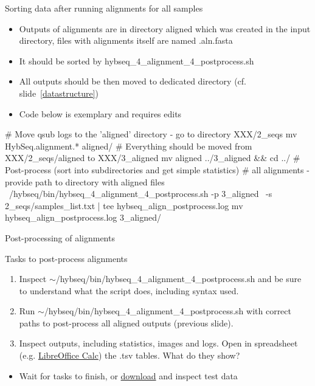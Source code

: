 \documentclass[compress,  xelatex, 11pt, xcolor=x11names, aspectratio=169,
	hyperref={
		bookmarks=true,
		unicode=true,
		colorlinks=true,
		pdftitle={HybSeq course},
		plainpages=false,
		pdfauthor={Vojtech Zeisek},
		pdfsubject={Practical processing of HybSeq target enrichment sequencing data on computing grids like MetaCentrum},
		pdfcreator={XeLaTeX},
		pdfkeywords={BASH, command line, GNU, HybSeq, Linux, MetaCentrum, sequencing shell, target enrichment},
		linkcolor=Turquoise4, %
		anchorcolor=DodgerBlue4, %
		citecolor=DodgerBlue4, %
		filecolor=DodgerBlue4, %
		menucolor=Tan4, %
		urlcolor=DarkOliveGreen4 %
		},
	url={hyphens, lowtilde} %
	]{beamer}
\renewcommand{\texttt}[1]{\colorbox{Cornsilk2}{{\ttfamily #1}}}
\renewcommand{\alert}[1]{\textcolor{OrangeRed3}{#1}}
\begin{document}
\begin{frame}[fragile]{Sorting data after running alignments for all samples}
	\begin{itemize}
		\item Outputs of alignments are in directory \texttt{aligned} which was created in the input directory, files with alignments itself are named \texttt{*.aln.fasta}
		\item It should be sorted by \texttt{hybseq\_4\_alignment\_4\_postprocess.sh}
		\item All outputs should be then moved to dedicated directory (cf. slide~\ref{datastructure})
		\item \alert{Code below is exemplary and requires edits}
	\end{itemize}
	\begin{bashcode}
    # Move qsub logs to the 'aligned' directory - go to directory XXX/2_seqs
    mv HybSeq.alignment.* aligned/
    # Everything should be moved from XXX/2_seqs/aligned to XXX/3_aligned
    mv aligned ../3_aligned && cd ../
    # Post-process (sort into subdirectories and get simple statistics)
    # all alignments - provide path to directory with aligned files
    ~/hybseq/bin/hybseq_4_alignment_4_postprocess.sh -p 3_aligned \
      -s 2_seqs/samples_list.txt | tee hybseq_align_postprocess.log
    mv hybseq_align_postprocess.log 3_aligned/
	\end{bashcode}
\end{frame}

\begin{frame}{Post-processing of alignments}
	\begin{exampleblock}{Tasks to post-process alignments}
		\begin{enumerate}
			\item Inspect \texttt{$\sim$/hybseq/bin/hybseq\_4\_alignment\_4\_postprocess.sh} and be sure to understand what the script does, including syntax used.
			\item Run \texttt{$\sim$/hybseq/bin/hybseq\_4\_alignment\_4\_postprocess.sh} with correct paths to post-process all aligned outputs (previous slide).
			\item Inspect outputs, including statistics, images and logs. Open in spreadsheet (e.g. \href{https://www.libreoffice.org/}{LibreOffice Calc}) the \texttt{*.tsv} tables. What do they show?
		\end{enumerate}
	\end{exampleblock}
	\vfill
	\begin{itemize}
		\item Wait for tasks to finish, or \href{https://botany.natur.cuni.cz/zeisek/hybseq_course_zingibers_3_aligned.zip}{download} and inspect test data
	\end{itemize}
	\vfill
\end{frame}
\end{document}
